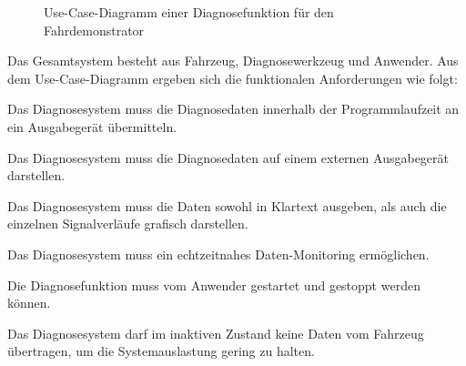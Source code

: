\begin{figure}[!htb]
	\centering
	\caption{Use-Case-Diagramm einer Diagnosefunktion für den Fahrdemonstrator}
	\label{abb:UseCaseDiagnose}
\end{figure}
	
Das Gesamtsystem besteht aus Fahrzeug, Diagnosewerkzeug und Anwender. Aus dem Use-Case-Diagramm ergeben sich die funktionalen Anforderungen wie folgt:

\begin{compactitem}
	\item Das Diagnosesystem muss die Diagnosedaten innerhalb der Programmlaufzeit an ein Ausgabegerät übermitteln.
	\item Das Diagnosesystem muss die Diagnosedaten auf einem externen Ausgabegerät darstellen.
	\item Das Diagnosesystem muss die Daten sowohl in Klartext ausgeben, als auch die einzelnen Signalverläufe grafisch darstellen. 
	\item Das Diagnosesystem muss ein echtzeitnahes Daten-Monitoring ermöglichen.
	\item Die Diagnosefunktion muss vom Anwender gestartet und gestoppt werden können.
	\item Das Diagnosesystem darf im inaktiven Zustand keine Daten vom Fahrzeug übertragen, um die Systemauslastung gering zu halten.\\
\end{compactitem}


